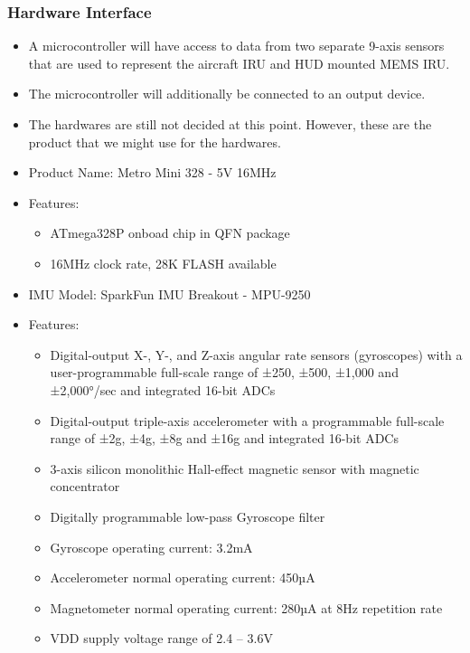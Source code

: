 \subsubsection{Hardware Interface}
\begin{itemize}
	\item 
	A microcontroller will have access to data from two separate 9-axis sensors that are used to represent the aircraft IRU and HUD mounted MEMS IRU.
	\item 
	The microcontroller will additionally be connected to an output device.
	\item 
	The hardwares are still not decided at this point. However, these are the product that we might use for the hardwares. 
	\item 
	Product Name: Metro Mini 328 - 5V 16MHz \cite{trinket}
	\item 
	Features: 
	\begin{itemize}
		\item ATmega328P onboad chip in QFN package
		\item 16MHz clock rate, 28K FLASH available
	\end{itemize}	
	\item 
	IMU Model: SparkFun IMU Breakout - MPU-9250 \cite{mpu9250}
	\item 
	Features: 
	\begin{itemize}
		\item Digital-output X-, Y-, and Z-axis angular rate sensors (gyroscopes) with a user-programmable full-scale range of ±250, ±500, ±1,000 and ±2,000°/sec and integrated 16-bit ADCs

		\item Digital-output triple-axis accelerometer with a programmable full-scale range of ±2g, ±4g, ±8g and ±16g and integrated 16-bit ADCs

		\item 3-axis silicon monolithic Hall-effect magnetic sensor with magnetic concentrator

		\item Digitally programmable low-pass Gyroscope filter
		\item Gyroscope operating current: 3.2mA
		\item Accelerometer normal operating current: 450µA
		\item Magnetometer normal operating current: 280µA at 8Hz repetition rate
		\item VDD supply voltage range of 2.4 – 3.6V
		\\
	\end{itemize}	
\end{itemize}


